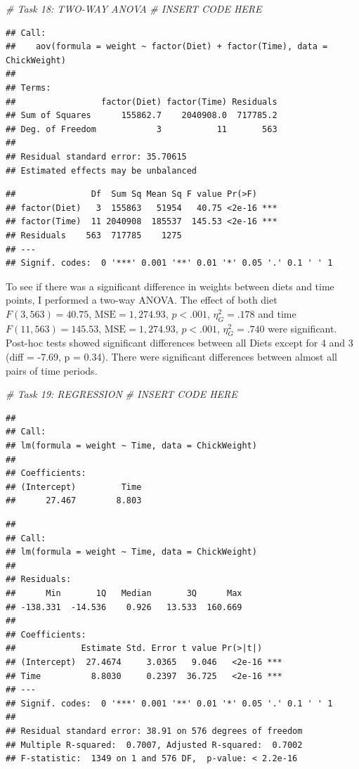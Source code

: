 \documentclass[english,man]{apa6}
\newenvironment{Shaded}{\begin{snugshade}}{\end{snugshade}}
\newcommand{\CommentTok}[1]{\textcolor[rgb]{0.56,0.35,0.01}{\textit{{#1}}}}
\begin{document}
\begin{Shaded}
\begin{Highlighting}[]
\CommentTok{# Task 18: TWO-WAY ANOVA}
\CommentTok{# INSERT CODE HERE}
\end{Highlighting}
\end{Shaded}

\begin{verbatim}
## Call:
##    aov(formula = weight ~ factor(Diet) + factor(Time), data = ChickWeight)
## 
## Terms:
##                 factor(Diet) factor(Time) Residuals
## Sum of Squares      155862.7    2040908.0  717785.2
## Deg. of Freedom            3           11       563
## 
## Residual standard error: 35.70615
## Estimated effects may be unbalanced
\end{verbatim}

\begin{verbatim}
##               Df  Sum Sq Mean Sq F value Pr(>F)    
## factor(Diet)   3  155863   51954   40.75 <2e-16 ***
## factor(Time)  11 2040908  185537  145.53 <2e-16 ***
## Residuals    563  717785    1275                   
## ---
## Signif. codes:  0 '***' 0.001 '**' 0.01 '*' 0.05 '.' 0.1 ' ' 1
\end{verbatim}

To see if there was a significant difference in weights between diets
and time points, I performed a two-way ANOVA. The effect of both diet
\(F(3, 563) = 40.75\), \(\mathrm{MSE} = 1,274.93\), \(p < .001\),
\(\eta^2_G = .178\) and time \(F(11, 563) = 145.53\),
\(\mathrm{MSE} = 1,274.93\), \(p < .001\), \(\eta^2_G = .740\) were
significant. Post-hoc tests showed significant differences between all
Diets except for 4 and 3 (diff = -7.69, p = 0.34). There were
significant differences between almost all pairs of time periods.

\begin{Shaded}
\begin{Highlighting}[]
\CommentTok{# Task 19: REGRESSION}
\CommentTok{# INSERT CODE HERE}
\end{Highlighting}
\end{Shaded}

\begin{verbatim}
## 
## Call:
## lm(formula = weight ~ Time, data = ChickWeight)
## 
## Coefficients:
## (Intercept)         Time  
##      27.467        8.803
\end{verbatim}

\begin{verbatim}
## 
## Call:
## lm(formula = weight ~ Time, data = ChickWeight)
## 
## Residuals:
##      Min       1Q   Median       3Q      Max 
## -138.331  -14.536    0.926   13.533  160.669 
## 
## Coefficients:
##             Estimate Std. Error t value Pr(>|t|)    
## (Intercept)  27.4674     3.0365   9.046   <2e-16 ***
## Time          8.8030     0.2397  36.725   <2e-16 ***
## ---
## Signif. codes:  0 '***' 0.001 '**' 0.01 '*' 0.05 '.' 0.1 ' ' 1
## 
## Residual standard error: 38.91 on 576 degrees of freedom
## Multiple R-squared:  0.7007, Adjusted R-squared:  0.7002 
## F-statistic:  1349 on 1 and 576 DF,  p-value: < 2.2e-16
\end{verbatim}
\end{document}

